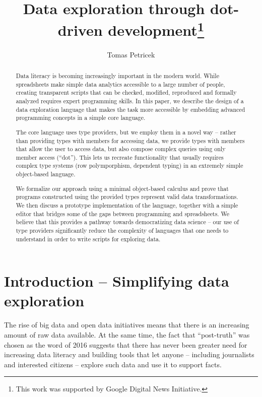 \documentclass[a4paper,UKenglish]{lipics-v2016}
\title{Data exploration through dot-driven development\footnote{This 
  work was supported by Google Digital News Initiative.}}
\author[1]{Tomas Petricek}
\affil[1]{The Alan Turing Institute, London, UK\\
  \texttt{tomas@tomasp.net}}
\begin{document}
\maketitle

\begin{abstract}
Data literacy is becoming increasingly important in the modern world. While spreadsheets make 
simple data analytics accessible to a large number of people, creating transparent scripts that 
can be checked, modified, reproduced and formally analyzed requires expert programming skills. 
In this paper, we describe the design of a data exploration language that makes the task more 
accessible by embedding advanced programming concepts in a simple core language.

The core language uses type providers, but we employ them in a novel way -- rather than providing 
types with members for accessing data, we provide types with members that allow the user to access 
data, but also compose complex queries using only member access (``dot''). This lets us recreate 
functionality that usually requires complex type systems (row polymporphism, dependent typing) 
in an extremely simple object-based language.

We formalize our approach using a minimal object-based calculus and prove that
programs constructed using the provided types represent valid data transformations. We then discuss 
a prototype implementation of the language, together with a simple editor that bridges
some of the gaps between programming and spreadsheets. We believe that this provides a pathway towards
democratizing data science -- our use of type providers significantly reduce the complexity of 
languages that one needs to understand in order to write scripts for exploring data.
\end{abstract}


\section{Introduction -- Simplifying data exploration}
\label{sec:intro}

The rise of big data and open data initiatives means that there is an increasing amount of raw data 
available. At the same time, the fact that ``post-truth'' was chosen as the word of 2016 suggests 
that there has never been greater need for increasing data literacy and building tools that let 
anyone -- including journalists and interested citizens -- explore such data and use it to support facts.
\end{document}
